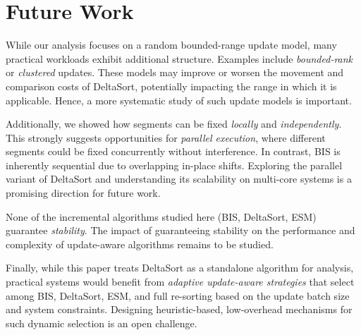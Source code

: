\section{Future Work}
\label{sec:future}

While our analysis focuses on a random bounded-range update model, many practical workloads exhibit additional structure. Examples include \emph{bounded-rank} or \emph{clustered} updates. These models may improve or worsen the movement and comparison costs of DeltaSort, potentially impacting the range in which it is applicable. Hence, a more systematic study of such update models is important.

Additionally, we showed how segments can be fixed \emph{locally} and \emph{independently}. This strongly suggests opportunities for \emph{parallel execution}, where different segments could be fixed concurrently without interference. In contrast, BIS is inherently sequential due to overlapping in-place shifts. Exploring the parallel variant of DeltaSort and understanding its scalability on multi-core systems is a promising direction for future work.

None of the incremental algorithms studied here (BIS, DeltaSort, ESM) guarantee \emph{stability}. The impact of guaranteeing stability on the performance and complexity of update-aware algorithms remains to be studied.

Finally, while this paper treats DeltaSort as a standalone algorithm for analysis, practical systems would benefit from \emph{adaptive update-aware strategies} that select among BIS, DeltaSort, ESM, and full re-sorting based on the update batch size and system constraints. Designing heuristic-based, low-overhead mechanisms for such dynamic selection is an open challenge.

